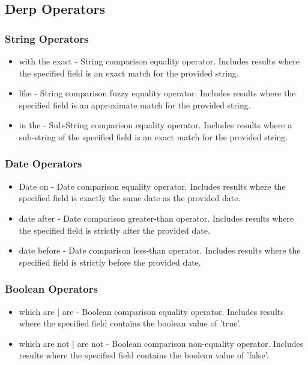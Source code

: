 \subsection{Derp Operators}
\subsubsection{String Operators}
\label{sub:DerpOperators}
\begin{itemize}
\item with the exact - String comparison equality operator. Includes results where the specified field is an exact match for the provided string.
\item like - String comparison fuzzy equality operator. Includes results where the specified field is an approximate match for the provided string.
\item in the - Sub-String comparison equality operator. Includes results where a sub-string of the specified field is an exact match for the provided string.
\end{itemize}
\subsubsection{Date Operators}
\begin{itemize}
\item Date on - Date comparison equality operator. Includes results where the specified field is exactly the same date as the provided date.
\item date after - Date comparison greater-than operator. Includes results where the specified field is strictly after the provided date.
\item date before - Date comparison less-than operator. Includes results where the specified field is strictly before the provided date.
\end{itemize}
\subsubsection{Boolean Operators}
\begin{itemize}
\item which are $|$ are - Boolean comparison equality operator. Includes results where the specified field contains the boolean value of 'true'.
\item which are not $|$ are not - Boolean comparison non-equality operator. Includes results where the specified field contains the boolean value of 'false'.
\end{itemize}
